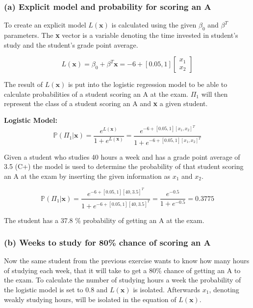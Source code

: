 \subsubsection*{(a) Explicit model and probability for scoring an A}

To create an explicit model $L(\textbf{x})$ is calculated using the given $\beta_0$ and $\beta^T$ parameters. The \textbf{x} vector is a variable denoting the time invested in student's study and the student's grade point average. 

\begin{equation*}
    L(\textbf{x}) = \beta_0+\beta^T \textbf{x}=-6+[0.05,1]\begin{bmatrix}x_1 \\ x_2\end{bmatrix}
\end{equation*} 

The result of $L(\textbf{x})$ is put into the logistic regression model to be able to calculate probabilities of a student scoring an A at the exam. $\Pi_1$ will then represent the class of a student scoring an A and \textbf{x} a given student.

\textbf{Logistic Model:}
\begin{equation*}
\mathbb{P}(\Pi_1 | \textbf{x}) = \frac{e^{L(\textbf{x})}}{1+e^{L(\textbf{x})}} = \frac{e^{-6+[0.05,1][x_1, x_2]^T}}{1+e^{-6+[0.05,1][x_1,x_2]^T}}    
\end{equation*}

Given a student who studies 40 hours a week and has a grade point average of 3.5 (C+) the model is used to determine the probability of that student scoring an A at the exam by inserting the given information as $x_1$ and $x_2$.

\begin{equation*}
\mathbb{P}(\Pi_1 | \textbf{x}) =  \frac{e^{-6+[0.05,1][40,3.5]^T}}{1+e^{-6+[0.05,1][40,3.5]^T}} =
\frac{e^{-0.5}}{1+e^{-0.5}} = 0.3775     
\end{equation*}

The student has a 37.8 \% probability of getting an A at the exam.

\subsubsection*{(b) Weeks to study for 80\% chance of scoring an A}

Now the same student from the previous exercise wants to know how many hours of studying each week, that it will take to get a 80\% chance of getting an A to the exam.
To calculate the number of studying hours a week the probability of the logistic model is set to 0.8 and $L(\textbf{x})$ is isolated. Afterwards $x_1$, denoting weakly studying hours, will be isolated in the equation of $L(\textbf{x})$. 

